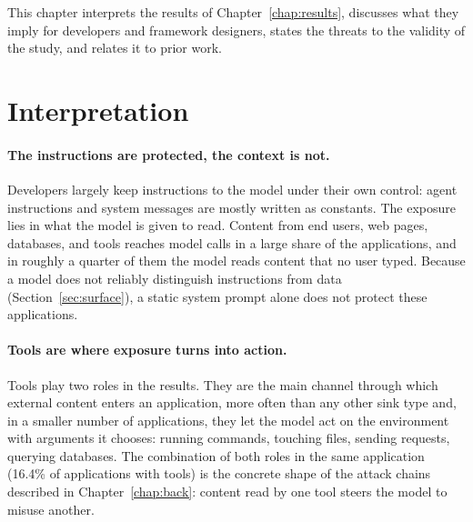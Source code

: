 \label{chap:discussion}

This chapter interprets the results of Chapter~\ref{chap:results}, discusses what they imply for developers and framework designers, states the threats to the validity of the study, and relates it to prior work.

\section{Interpretation}
\label{sec:disc-interpretation}

\paragraph{The instructions are protected, the context is not.} Developers largely keep instructions to the model under their own control: agent instructions and system messages are mostly written as constants. The exposure lies in what the model is given to read. Content from end users, web pages, databases, and tools reaches model calls in a large share of the applications, and in roughly a quarter of them the model reads content that no user typed. Because a model does not reliably distinguish instructions from data (Section~\ref{sec:surface}), a static system prompt alone does not protect these applications.

\paragraph{Tools are where exposure turns into action.} Tools play two roles in the results. They are the main channel through which external content enters an application, more often than any other sink type and, in a smaller number of applications, they let the model act on the environment with arguments it chooses: running commands, touching files, sending requests, querying databases. The combination of both roles in the same application (16.4\% of applications with tools) is the concrete shape of the attack chains described in Chapter~\ref{chap:back}: content read by one tool steers the model to misuse another.

